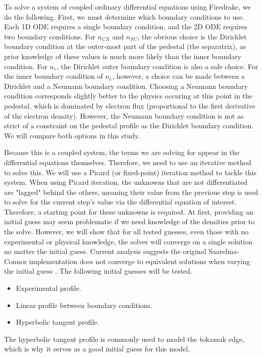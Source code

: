 \documentclass[twocolumn,secnumarabic,amssymb, nobibnotes, aps, prd]{revtex4-2}
\begin{document}
To solve a system of coupled ordinary differential equations using Firedrake, we do the following. 
First, we must determine which boundary conditions to use.
Each 1D ODE requires a single boundary condition, and the 2D ODE requires two boundary conditions.
For $n_{CX}$ and $n_{FC}$, the obvious choice is the Dirichlet boundary condition at the outer-most part of the pedestal (the separatrix), as prior knowledge of these values is much more likely than the inner boundary condition. 
For $n_e$, the Dirichlet outer boundary condition is also a safe choice. 
For the inner boundary condition of $n_e$, however, a choice can be made between a Dirichlet and a Neumann boundary condition. 
Choosing a Neumann boundary condition corresponds slightly better to the physics occuring at this point in the pedestal, which is dominated by electron flux (proportional to the first derivative of the electron density).
However, the Neumann boundary condition is not as strict of a constraint on the pedestal profile as the Dirichlet boundary condition.
We will compare both options in this study.

Because this is a coupled system, the terms we are solving for appear in the differential equations themselves. 
Therefore, we need to use an iterative method to solve this. 
We will use a Picard (or fixed-point) iteration method to tackle this system. 
When using Picard iteration, the unknowns that are not differentiated are "lagged" behind the others, meaning their value from the previous step is used to solve for the current step's value via the differential equation of interest. 
Therefore, a starting point for these unknowns is required.
At first, providing an initial guess may seem problematic if we need knowledge of the densities prior to the solve. 
However, we will show that for all tested guesses, even those with no experimental or physical knowledge, the solver will converge on a single solution no matter the initial guess. 
Current analysis suggests the original Saarelma-Connor implementation does not converge to equivalent solutions when varying the initial guess \cite{JohnLabbate}.
The following initial guesses will be tested.
\begin{itemize}
    \item Experimental profile.
    \item Linear profile between boundary conditions.
    \item Hyperbolic tangent profile.
\end{itemize}
The hyperbolic tangent profile is commonly used to model the tokamak edge, which is why it serves as a good initial guess for this model.
\end{document}
